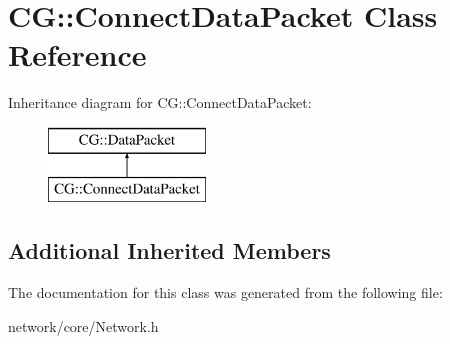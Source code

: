 \hypertarget{class_c_g_1_1_connect_data_packet}{}\section{CG\+:\+:Connect\+Data\+Packet Class Reference}
\label{class_c_g_1_1_connect_data_packet}
Inheritance diagram for CG\+:\+:Connect\+Data\+Packet\+:\begin{figure}[H]
\begin{center}
\leavevmode
\includegraphics[height=2.000000cm]{class_c_g_1_1_connect_data_packet}
\end{center}
\end{figure}
\subsection*{Additional Inherited Members}


The documentation for this class was generated from the following file\+:\begin{DoxyCompactItemize}
\item 
network/core/Network.\+h\end{DoxyCompactItemize}
